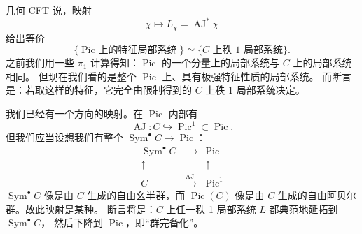 几何 CFT 说，映射
\begin{equation}\tag{7.34}\label{eq:7.34}
\chi\mapsto L_{\chi}=\operatorname{AJ}^*\chi
\end{equation}
给出等价
\begin{equation}\tag{7.35}\label{eq:7.35}
\bigl\{\text{$\operatorname{Pic}$ 上的特征局部系统}\bigr\}
\simeq\bigl\{\text{$C$ 上秩 1 局部系统}\bigr\}.
\end{equation}
之前我们用一些 $\pi_1$ 计算得知：$\operatorname{Pic}$ 的一个分量上的局部系统与 $C$ 上的局部系统相同。
但现在我们看的是整个 $\operatorname{Pic}$ 上、具有极强特征性质的局部系统。
而断言是：若取这样的特征，它完全由限制得到的 $C$ 上秩 1 局部系统决定。

我们已经有一个方向的映射。在 $\operatorname{Pic}$ 内部有
\begin{equation}\tag{7.36}\label{eq:7.36}
\operatorname{AJ}\colon C\hookrightarrow\operatorname{Pic}^1\subset\operatorname{Pic}.
\end{equation}
但我们应当设想我们有整个 $\operatorname{Sym}^{\bullet}C\to\operatorname{Pic}$：
\begin{equation}\tag{7.37}\label{eq:7.37}
\begin{array}{ccc}
\operatorname{Sym}^{\bullet}C & \xrightarrow{\qquad} & \operatorname{Pic}\\[2pt]
\uparrow & & \uparrow\\[2pt]
C & \xrightarrow{\ \operatorname{AJ}\ } & \operatorname{Pic}^1
\end{array}
\end{equation}
$\operatorname{Sym}^{\bullet}C$ 像是由 $C$ 生成的自由幺半群，而 $\operatorname{Pic}(C)$ 像是由 $C$
生成的自由阿贝尔群。故此映射是某种。
断言将是：$C$ 上任一秩 1 局部系统 $L$ 都典范地延拓到 $\operatorname{Sym}^{\bullet}C$，
然后下降到 $\operatorname{Pic}$，即“群完备化”。

